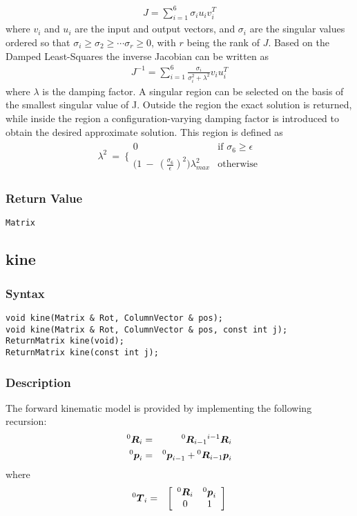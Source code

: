 \documentclass[11pt,fleqn,letterpaper]{report}
\newcommand{\mbold}[1]{\mbox{\boldmath $ #1 $}}
\newcommand{\matr}[2]{\left[\begin{array}{#1} #2 \end{array}\right]}
\begin{document}
\begin{eqnarray}
  J = \sum_{i=1}^6\sigma_i u_i v_i^T
\end{eqnarray}
where $v_i$ and $u_i$ are the input and output vectors, and $\sigma_i$ are the singular values ordered so that
$\sigma_i \geq \sigma_2 \geq \cdots \sigma_r \geq 0$, with $r$ being the rank of $J$. Based on the Damped Least-Squares
the inverse Jacobian can be written as
\begin{eqnarray}
  J^{-1} = \sum_{i=1}^6\frac{\sigma_i}{\sigma_i^2 + \lambda^2}v_iu_i^T
\end{eqnarray}
where $\lambda$ is the damping factor. A singular region can be selected on the basis of the smallest singular value of J.
Outside the region the exact solution is returned, while inside the region a configuration-varying damping factor is 
introduced to obtain the desired approximate solution. This region is defined as
\begin{eqnarray}
  \lambda^2\ =\ \Bigg\{
  \begin{array}{cc}
    0 &     \textrm{if $\sigma_6 \geq \epsilon$} \\
    \Big(1\ -\ (\frac{\sigma_6}{\epsilon})^2 \Big)\lambda^2_{max} & \textrm{otherwise}
  \end{array}
\end{eqnarray}

\subsubsection*{Return Value}

{\tt Matrix}
 \newpage 


\subsection*{kine}
\subsubsection*{Syntax}
\begin{verbatim}
void kine(Matrix & Rot, ColumnVector & pos);
void kine(Matrix & Rot, ColumnVector & pos, const int j);
ReturnMatrix kine(void);
ReturnMatrix kine(const int j);
\end{verbatim}
\subsubsection*{Description}
The forward kinematic model is provided by implementing 
the following recursion:
\begin{eqnarray}
{}^0 \mbold{R}_i & = & {}^0 \mbold{R}_{i-1} {}^{i-1}\mbold{R}_i \\
{}^0 \mbold{p}_i & = & {}^0 \mbold{p}_{i-1} + {}^0 \mbold{R}_{i-1} \mbold{p}_i 
\end{eqnarray}
where
\begin{eqnarray}
{}^0 \mbold{T}_i & = & \matr{cc}{
{}^0 \mbold{R}_{i} & {}^0 \mbold{p}_i \\
0 & 1 }
\end{eqnarray}
\end{document}
